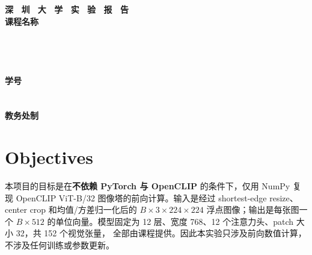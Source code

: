 \documentclass[a4paper,12pt]{article}
\begin{document}
\begin{titlepage}
    \centering
    \vspace*{1.6cm}
    \Huge{\textbf{深 \ 圳 \ 大 \ 学 \ 实 \ 验 \ 报 \ 告}}\\[1.3cm]

    {\Large\textbf{课程名称}\quad\underline{}}\\[0.45cm]
    {\Large
    \noindent{}
    \underline{}}\\[0.45cm]
    {\Large
    \noindent{}
    \underline{}}\\[0.45cm]
    {\Large
    \noindent{}
    \underline{\makebox[8cm][c]{}}}\\[0.45cm]
    {\Large
    \noindent{}
    \underline{}}\\[0.45cm]
    {\Large
    \noindent{}
    \underline{\makebox[3cm][c]{}}
    \hspace{0.4cm}
    \textbf{学号}
    \underline{\makebox[3cm][c]{}}}\\[0.45cm]
    {\Large
    \noindent{}
    \underline{\makebox[8cm][c]{}}}\\[0.45cm]
    {\Large
    \noindent{}
    \underline{\makebox[8cm][c]{}}}\\[1.2cm]

    \vfill
    \Large{\textbf{教务处制}}
\end{titlepage}

\newpage

\section{Objectives}

本项目的目标是在\textbf{不依赖 PyTorch 与 OpenCLIP} 的条件下，仅用 NumPy
复现 OpenCLIP ViT-B/32 图像塔的前向计算。输入是经过 shortest-edge
resize、center crop 和均值/方差归一化后的 $B\times3\times224\times224$
浮点图像；输出是每张图一个 $B\times512$ 的单位向量。模型固定为
12 层、宽度 768、12 个注意力头、patch 大小 32，共 152 个视觉张量，
全部由课程提供。因此本实验只涉及前向数值计算，不涉及任何训练或参数更新。
\end{document}
